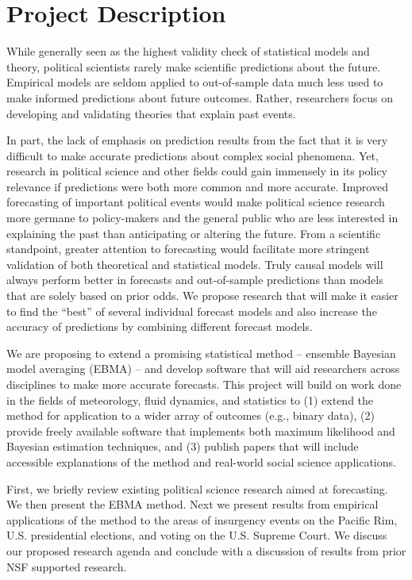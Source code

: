 \documentclass[pdftex,12pt,fullpage,oneside]{amsart}
\begin{document}
\newpage
\setcounter{page}{1}

\section*{Project Description}

While generally seen as the highest validity check of statistical
models and theory, political scientists rarely make scientific
predictions about the future.  Empirical models are seldom applied to %
out-of-sample data much less used to make informed predictions about
future outcomes.  Rather, researchers focus on developing and
validating theories that explain past events.

In part, the lack of emphasis on prediction results from the fact that
it is very difficult to make accurate predictions about complex social
phenomena. Yet, research in political science and other fields could
gain immensely in its policy relevance if predictions were both more common
and more accurate.  Improved forecasting of important political events
would make political science research more germane to policy-makers
and the general public who are less interested in explaining the past
than anticipating or altering the future.  From a scientific
standpoint, greater attention to forecasting would facilitate more
stringent validation of both theoretical and statistical models. Truly causal models will always perform better in forecasts and out-of-sample predictions than models that are solely based on prior odds. We propose research that will make it easier to find the ``best'' of several individual forecast models and also increase the accuracy of predictions by combining different forecast models. 

We are proposing to extend a promising statistical method -- ensemble Bayesian model averaging
(EBMA) -- and develop software that will aid researchers across
disciplines to make more accurate forecasts.  This project will build
on work done in the fields of meteorology, fluid dynamics, and
statistics to (1) extend the method for application to a wider array
of outcomes (e.g., binary data), (2) provide freely available software
that implements both maximum likelihood and Bayesian estimation
techniques, and (3) publish papers that will include accessible
explanations of the method and real-world social science applications.

First, we briefly review existing political science research aimed at forecasting.  We then present the EBMA method.  Next we
present results from empirical applications of the method to the areas
of insurgency events on the Pacific Rim, U.S. presidential elections,
and voting on the U.S. Supreme Court.  We discuss our proposed
research agenda and conclude with a discussion of
results from prior NSF supported research.
\end{document}
